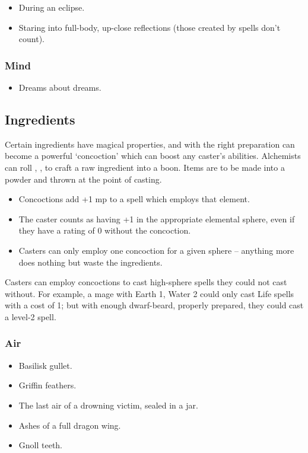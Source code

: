 \begin{multicols}{2}
\begin{itemize}
  \item
  During an eclipse.
  \item
  Staring into full-body, up-close reflections (those created by spells don't count).
\end{itemize}

\subsubsection{Mind}

\begin{itemize}
  \item
  Dreams about dreams.
\end{itemize}

\subsection{Ingredients}

Certain ingredients have magical properties, and with the right preparation can become a powerful `concoction' which can boost any caster's abilities.
Alchemists can roll , \tn[12], to craft a raw ingredient into a boon.
Items are to be made into a powder and thrown at the point of casting.

\begin{itemize}
  \item
  Concoctions add +1 \gls{mp} to a spell which employs that element.
  \item
  The caster counts as having +1 in the appropriate elemental sphere, even if they have a rating of 0 without the concoction.
  \item
  Casters can only employ one concoction for a given sphere -- anything more does nothing but waste the ingredients.
\end{itemize}

Casters can employ concoctions to cast high-sphere spells they could not cast without.
For example, a mage with Earth 1, Water 2 could only cast Life spells with a cost of 1; but with enough dwarf-beard, properly prepared, they could cast a level-2 spell.

\subsubsection{Air}

\begin{itemize}
  \item
  Basilisk gullet.
  \item
  Griffin feathers.
  \item
  The last air of a drowning victim, sealed in a jar.
  \item
  Ashes of a full dragon wing.
  \item
  Gnoll teeth.
\end{itemize}


\end{multicols}
